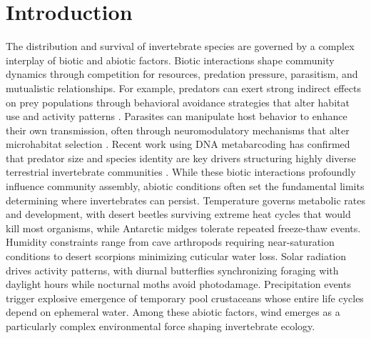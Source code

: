 \usepackage{hyperref}
\usepackage{longtable}

\chapter{Introduction}
\label{ch:introduction}

The distribution and survival of invertebrate species are governed by a complex interplay of biotic and abiotic factors. Biotic interactions shape community dynamics through competition for resources, predation pressure, parasitism, and mutualistic relationships. For example, predators can exert strong indirect effects on prey populations through behavioral avoidance strategies that alter habitat use and activity patterns \citep{blois-heulinDirectIndirectEffects1990}. Parasites can manipulate host behavior to enhance their own transmission, often through neuromodulatory mechanisms that alter microhabitat selection \citep{laffertyComparingMechanismsHost2013}. Recent work using DNA metabarcoding has confirmed that predator size and species identity are key drivers structuring highly diverse terrestrial invertebrate communities \citep{miller-ter_kuilePredatorpreyInteractionsTerrestrial2022}. While these biotic interactions profoundly influence community assembly, abiotic conditions often set the fundamental limits determining where invertebrates can persist. Temperature governs metabolic rates and development, with desert beetles surviving extreme heat cycles that would kill most organisms, while Antarctic midges tolerate repeated freeze-thaw events. Humidity constraints range from cave arthropods requiring near-saturation conditions to desert scorpions minimizing cuticular water loss. Solar radiation drives activity patterns, with diurnal butterflies synchronizing foraging with daylight hours while nocturnal moths avoid photodamage. Precipitation events trigger explosive emergence of temporary pool crustaceans whose entire life cycles depend on ephemeral water. Among these abiotic factors, wind emerges as a particularly complex environmental force shaping invertebrate ecology.

